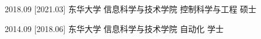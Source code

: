 \documentclass[zh]{resume}
\begin{document}




\begin{educations}
  \education%
    {2018.09}%
    [2021.03]%
    {东华大学}%
    {信息科学与技术学院}%
    {控制科学与工程}%
    {硕士}

  \separator{0.5ex}
  \education%
    {2014.09}%
    [2018.06]%
    {东华大学}%
    {信息科学与技术学院}%
    {自动化}%
    {学士}
\end{educations}


  
\end{document}
